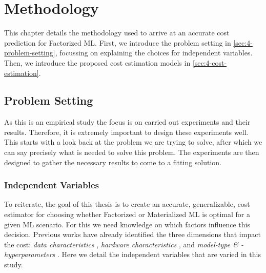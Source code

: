 
\chapter{Methodology}

\label{chapter:methodology}

This chapter details the methodology used to arrive at an accurate cost prediction for Factorized ML. First, we introduce the problem setting in \autoref{sec:4-problem-setting}, focussing on explaining the choices for independent variables. Then, we introduce the proposed cost estimation models in \autoref{sec:4-cost-estimation}.

\section{Problem Setting}
\label{sec:4-problem-setting}

As this is an empirical study the focus is on carried out experiments and their results. Therefore, it is extremely important to design these experiments well. This starts with a look back at the problem we are trying to solve, after which we can say precisely what is needed to solve this problem. The experiments are then designed to gather the necessary results to come to a fitting solution.

\subsection{Independent Variables}
To reiterate, the goal of this thesis is to create an accurate, generalizable, cost estimator for choosing whether Factorized or Materialized ML is optimal for a given ML scenario. For this we need knowledge on which factors influence this decision. Previous works have already identified the three dimensions that impact the cost: \emph{data characteristics} \cite{morpheus, amalur,schijndel_cost_estimation}, \emph{hardware characteristics} \cite{orion_learning_gen_lin_models}, and \emph{model-type \& -hyperparameters} \cite{amalur,schijndel_cost_estimation}. Here we detail the independent variables that are varied in this study.

